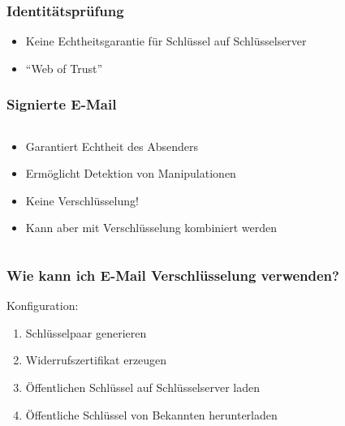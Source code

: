 \begin{frame}
  \frametitle{Identitätsprüfung}
  \begin{itemize}
    \item Keine Echtheitsgarantie für Schlüssel auf Schlüsselserver
    \item ``Web of Trust''
  \end{itemize}
  \center {}
\end{frame}

\begin{frame}
  \frametitle{Signierte E-Mail}
  \begin{columns}[c]
    \begin{column}{0.5\textwidth}
      \begin{itemize}
	\item Garantiert Echtheit des Absenders
	\item Ermöglicht Detektion von Manipulationen
	\item Keine Verschlüsselung!
	\item Kann aber mit Verschlüsselung kombiniert werden
      \end{itemize}
    \end{column}
    \begin{column}{0.5\textwidth}
      \center {}
    \end{column}
  \end{columns}
\end{frame}

\begin{frame}
  \frametitle{Wie kann ich E-Mail Verschlüsselung verwenden?}

      Konfiguration:
      \begin{enumerate}
        \item Schlüsselpaar generieren
        \item Widerrufszertifikat erzeugen
        \item Öffentlichen Schlüssel auf Schlüsselserver laden
        \item Öffentliche Schlüssel von Bekannten herunterladen
      \end{enumerate}

\end{frame}
